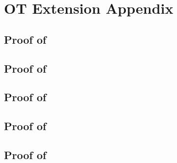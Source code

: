 
\section{OT Extension Appendix}\label{sec:extApp}


\iffullversion
\else
\subsection{Proof of }



\subsection{Proof of }



\subsection{Proof of }



\subsection{Proof of }



\subsection{Proof of }

\fi